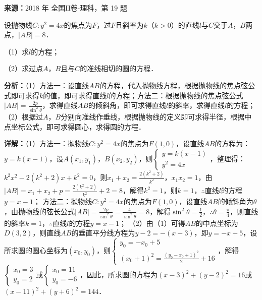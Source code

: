 \begin{question}[points=12]
\textbf{来源：}2018 年 全国II卷-理科，第 19 题\par
设抛物线$C:y^2=4x$的焦点为$F$，过$F$且斜率为$k$（$k>0$）的直线$l$与$C$交于$A$，$B$两点，$|AB|=8$．

（1）求$l$的方程；

（2）求过点$A$，$B$且与$C$的准线相切的圆的方程．
\begin{solution}

\textbf{分析：}（1）方法一：设直线$AB$的方程，代入抛物线方程，根据抛物线的焦点弦公式即可求得$k$的值，即可求得直线$l$的方程；方法二：根据抛物线的焦点弦公式$|AB|=\frac{2p}{\sin^2\theta}$，求得直线$AB$的倾斜角，即可求得直线$l$的斜率，求得直线$l$的方程；
（2）根据过$A$，$B$分别向准线作垂线，根据抛物线的定义即可求得半径，根据中点坐标公式，即可求得圆心，求得圆的方程．

\textbf{详解：}（1）方法一：抛物线$C:y^2=4x$的焦点为$F(1,0)$，设直线$AB$的方程为：$y=k(x-1)$，设$A(x_1,y_1)$，$B(x_2,y_2)$，则$\begin{cases} y=k(x-1) \\ y^2=4x \end{cases}$，整理得：$k^2x^2-2(k^2+2)x+k^2=0$，则$x_1+x_2=\frac{2(k^2+2)}{k^2}$，$x_1x_2=1$，由$|AB|=x_1+x_2+p=\frac{2(k^2+2)}{k^2}+2=8$，解得$k^2=1$，则$k=1$，$\therefore$直线$l$的方程$y=x-1$；
方法二：抛物线$C:y^2=4x$的焦点为$F(1,0)$，设直线$AB$的倾斜角为$\theta$，由抛物线的弦长公式$|AB|=\frac{2p}{\sin^2\theta}=\frac{4}{\sin^2\theta}=8$，解得$\sin^2\theta=\frac{1}{2}$，$\therefore\theta=\frac{\pi}{4}$，则直线的斜率$k=1$，$\therefore$直线$l$的方程$y=x-1$；
（2）由（1）可得$AB$的中点坐标为$D(3,2)$，则直线$AB$的垂直平分线方程为$y-2=-(x-3)$，即$y=-x+5$，设所求圆的圆心坐标为$(x_0,y_0)$，则$\begin{cases} y_0=-x_0+5 \\ (x_0+1)^2=\frac{(y_0-x_0+1)^2}{2}+16 \end{cases}$，解得$\begin{cases} x_0=3 \\ y_0=2 \end{cases}$或$\begin{cases} x_0=11 \\ y_0=-6 \end{cases}$，因此，所求圆的方程为$(x-3)^2+(y-2)^2=16$或$(x-11)^2+(y+6)^2=144$．
\end{solution}
\end{question}

